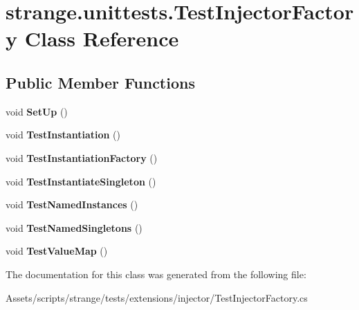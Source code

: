\hypertarget{classstrange_1_1unittests_1_1_test_injector_factory}{\section{strange.\-unittests.\-Test\-Injector\-Factory Class Reference}
\label{classstrange_1_1unittests_1_1_test_injector_factory}
}
\subsection*{Public Member Functions}
\begin{DoxyCompactItemize}
\item 
\hypertarget{classstrange_1_1unittests_1_1_test_injector_factory_ae7e64663e8d1ee9d787a7d00c4c914e7}{void {\bfseries Set\-Up} ()}\label{classstrange_1_1unittests_1_1_test_injector_factory_ae7e64663e8d1ee9d787a7d00c4c914e7}

\item 
\hypertarget{classstrange_1_1unittests_1_1_test_injector_factory_a6c62f4b36cf8394d078386ae0829acb9}{void {\bfseries Test\-Instantiation} ()}\label{classstrange_1_1unittests_1_1_test_injector_factory_a6c62f4b36cf8394d078386ae0829acb9}

\item 
\hypertarget{classstrange_1_1unittests_1_1_test_injector_factory_a5b85d3ba6f81a52bfc6fca94d4f314e0}{void {\bfseries Test\-Instantiation\-Factory} ()}\label{classstrange_1_1unittests_1_1_test_injector_factory_a5b85d3ba6f81a52bfc6fca94d4f314e0}

\item 
\hypertarget{classstrange_1_1unittests_1_1_test_injector_factory_a0a3380838ef98370c918a08a01504245}{void {\bfseries Test\-Instantiate\-Singleton} ()}\label{classstrange_1_1unittests_1_1_test_injector_factory_a0a3380838ef98370c918a08a01504245}

\item 
\hypertarget{classstrange_1_1unittests_1_1_test_injector_factory_a78cb9ddcf327e9073a7f17776c024dec}{void {\bfseries Test\-Named\-Instances} ()}\label{classstrange_1_1unittests_1_1_test_injector_factory_a78cb9ddcf327e9073a7f17776c024dec}

\item 
\hypertarget{classstrange_1_1unittests_1_1_test_injector_factory_a6779f786f70939c6ce66578bcc5c87a3}{void {\bfseries Test\-Named\-Singletons} ()}\label{classstrange_1_1unittests_1_1_test_injector_factory_a6779f786f70939c6ce66578bcc5c87a3}

\item 
\hypertarget{classstrange_1_1unittests_1_1_test_injector_factory_adf3bd6845bc78e3a34643f40bffb1c4c}{void {\bfseries Test\-Value\-Map} ()}\label{classstrange_1_1unittests_1_1_test_injector_factory_adf3bd6845bc78e3a34643f40bffb1c4c}

\end{DoxyCompactItemize}


The documentation for this class was generated from the following file\-:\begin{DoxyCompactItemize}
\item 
Assets/scripts/strange/tests/extensions/injector/Test\-Injector\-Factory.\-cs\end{DoxyCompactItemize}
